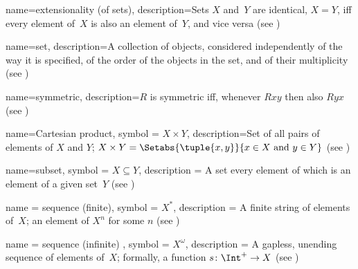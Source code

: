 
 {
  name={extensionality (of sets)},  
  description={Sets $X$ and~$Y$ are identical, $X = Y$, iff every
    element of~$X$ is also an element of~$Y$, and vice versa
    (see )}}


 {
  name=set,  
  description={A collection of objects, considered independently of
    the way it is specified, of the order of the objects in the set,
    and of their multiplicity (see )} }

 {
  name=symmetric,  
  description={$R$ is symmetric iff, whenever $Rxy$ then also $Ryx$
    (see )} }

 {
  name=Cartesian product,
  symbol = {\ensuremath{X \times Y}},  
  description={Set of all pairs of {elements} of $X$ and $Y$; $X
    \times Y = \Setabs{\tuple{x, y}}{x \in X \text{ and } y \in Y}$
    (see )} }

 {
  name=subset,
  symbol = {\ensuremath{X \subseteq Y}},
  description = {A set every {element} of which is an {element} of
    a given set~$Y$ (see )}  }

 {
  name = {sequence (finite)},
  symbol = {\ensuremath{X^*}},
  description = {A finite string of {element}s of~$X$; an
    {element} of $X^n$ for some $n$ (see
    )}}

 {
  name = {sequence (infinite) },
  symbol = {\ensuremath{X^\omega}},
  description = {A gapless, unending sequence of {element}s of~$X$;
    formally, a function $s\colon \Int^+ \to X$ (see
    )}}

